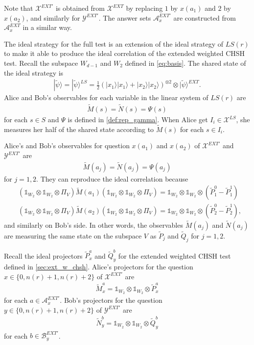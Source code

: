 \documentclass[11pt,letterpaper]{article}
\newcommand{\ket}[1]{|#1\rangle}
\newcommand{\x}{\otimes}
\newcommand{\calX}{\mathcal{X}}
\newcommand{\calY}{\mathcal{Y}}
\newcommand{\calA}{\mathcal{A}}
\newcommand{\calB}{\mathcal{B}}
\newcommand{\1}{\mathbb{1}}
\newcommand{\EXT}{EXT}
\newcommand{\LS}{LS}
\newcommand{\tP}{\tilde{P}}
\newcommand{\tQ}{\tilde{Q}}
\newcommand{\tM}{\tilde{M}}
\newcommand{\tN}{\tilde{N}}
\newcommand{\tpsi}{\tilde{\psi}}
\newcommand{\nr}{n(r)}
\theoremstyle{definition}
\begin{document}
Note that $\calX^{\EXT'}$ is obtained from $\calX^{\EXT}$ by replacing 
$1$ by $x(a_1)$ and $2$ by $x(a_2)$, and similarly for $\calY^{\EXT'}$.
The answer sets $\calA_x^{\EXT'}$ are constructed from $\calA_x^{\EXT}$
in a similar way.

The ideal strategy for the full test is an extension of the ideal strategy of $\LS(r)$ to make it able to produce the ideal correlation of 
the extended weighted CHSH test.
Recall the subspace $W_{d-1}$ and $W_2$ defined in \cref{eq:basis}.
The shared state of the ideal strategy is
\begin{align*}
    \ket{\tpsi} = \ket{\tpsi}^{\LS} = \frac{1}{2}(\ket{x_1}\ket{x_1} + 
    \ket{x_2}\ket{x_2})^{\x 2} \x \ket{\tpsi}^{\EXT}.
\end{align*}
Alice and Bob's observables for each variable in the linear system of 
$\LS(r)$ are 
\begin{align*}
    \tM(s) = \tN(s) = \Psi(s) 
\end{align*}
for each $s \in S$ and $\Psi$ is defined in \cref{def:rep_gamma}.
When Alice get $I_i \in \calX^{\LS}$, she measures her half of the shared
state according to $\tM(s)$ for each $s \in I_i$.

Alice's and Bob's observables for question $x(a_1)$ and $x(a_2)$ of $\calX^{\EXT'}$ and $\calY^{\EXT'}$ are
\begin{align*}
    \tM(a_j) = \tN(a_j) = \Psi(a_j) 
\end{align*}
for $j= 1,2$.
They can reproduce the ideal correlation because
\begin{align*}
    &(\1_{W_2} \x \1_{W_2} \x \Pi_V) \tM(a_1) (\1_{W_2} \x \1_{W_2} \x \Pi_V) = \1_{W_2} \x \1_{W_2} \x (\tP_1^0 - \tP_1^1) \\
    &(\1_{W_2} \x \1_{W_2} \x \Pi_V) \tM(a_2) (\1_{W_2} \x \1_{W_2} \x \Pi_V) = \1_{W_2} \x \1_{W_2} \x (\tP_2^0 - \tP_2^1),
\end{align*}
and similarly on Bob's side.
In other words, the observables $\tM(a_j)$ and $\tN(a_j)$ are 
measuring the same state on the subspace $V$ as $\tP_j$ and $\tQ_j$
for $j = 1,2$.

Recall the ideal projectors $\tP_x^a$ and $\tQ_y^b$ for the extended 
weighted CHSH test defined in \cref{sec:ext_w_chsh}.
Alice's projectors for the question $x \in \{0, \nr+1, \nr+2\}$ of $\calX^{\EXT'}$ are
\begin{align*}
    \tM_x^a = \1_{W_2} \x \1_{W_2} \x \tP_x^a
\end{align*}
for each $a \in \calA^{\EXT'}_x$.
Bob's projectors for the question $y \in \{0, \nr+1, \nr+2\}$ of $\calY^{\EXT'}$ are 
\begin{align*}
    \tN_y^b = \1_{W_2} \x \1_{W_2} \x \tQ_y^b
\end{align*}
for each $b \in \calB^{\EXT'}_y$.
\end{document}
